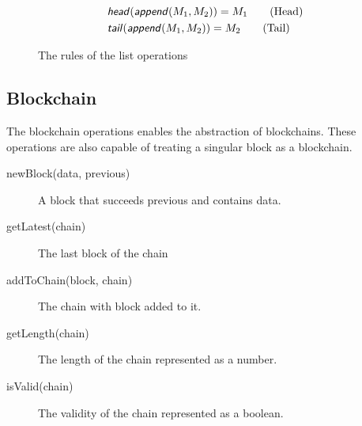 \begin{figure}[h]
	\begin{align*}
		&\text{\sffamily \textit{head}\normalfont}(\text{\sffamily \textit{append}\normalfont}(M_1, M_2)) = M_1 \tag{Head} \\
		&\text{\sffamily \textit{tail}\normalfont}(\text{\sffamily \textit{append}\normalfont}(M_1, M_2)) = M_2 \tag{Tail}
	\end{align*}
	\caption{The rules of the list operations}
	\label{listoprules}
\end{figure}
\FloatBarrier

\subsection{Blockchain}

The blockchain operations enables the abstraction of blockchains. These operations are also capable of treating a singular block as a blockchain.

\begin{description}
	\item[newBlock(data, previous)]
	A block that succeeds previous and contains data.
	\item[getLatest(chain)]
	The last block of the chain
	\item[addToChain(block, chain)]
	The chain with block added to it.
	\item[getLength(chain)]
	The length of the chain represented as a number.
	\item[isValid(chain)]
	The validity of the chain represented as a boolean.
\end{description}


